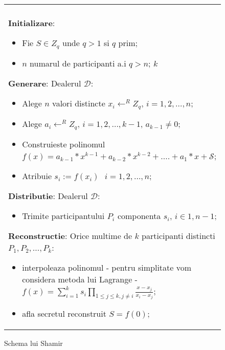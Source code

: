 \documentclass{llncs}
\begin{document}
\begin{figure*}[h!]

\begin{tabular}{|p{\textwidth}|}
\hline

\\
\hspace{.1in}
\textbf{Initializare}: 
	\begin{itemize}
		\item Fie $S \in Z_q$ unde $q > 1 $ si $q$ prim;
		\item $n$ numarul de participanti a.i $q > n$; $k$ 
	\end{itemize}
\medskip

\hspace{.1in}
\textbf{Generare}: Dealerul $\mathcal{D}$:
	\begin{itemize}
		\item Alege $n$ valori distincte $x_i \leftarrow^R Z_q \text{, }i = 1,2,\dots,n$;
		\item Alege $a_{i} \leftarrow^R Z_q \text{, }i = 1,2,\dots,{k - 1}$, $a_{k-1} \neq 0$;
		\item Construieste polinomul $f(x) = a_{k - 1} * x ^ {k-1} + a_{k-2} * x ^ {k - 2} + .... + a_1 * x + \mathcal{S}$;
		\item Atribuie $s_i := f(x_i) \text{ } i = 1,2,\dots,n$;
	\end{itemize}
\medskip

\hspace{.1in}
\textbf{Distributie}: Dealerul $\mathcal{D}$:
	\begin{itemize}
		\item Trimite participantului $P_i$ componenta $s_i$, $i \in {1,n-1}$;
	\end{itemize}

\hspace{.1in}
\textbf{Reconstructie}: Orice multime de $k$ participanti distincti $P_1, P_2, \dots, P_k$:
	\begin{itemize}
		\item interpoleaza polinomul - pentru simplitate vom considera metoda lui Lagrange -
			\hspace{.7in} $f(x)=\sum_{i=1}^{k} {s_i}\prod_{1 \leq j \leq k, j \neq i} \frac{x-x_j}{x_i-x_j}$;
		\item afla secretul reconstruit $S = f(0)$;
	\end{itemize}

\\
\hline
\end{tabular}

\caption{Schema lui Shamir \cite{S:1979}}
\label{fig:shamir_scheme}
\end{figure*}
\end{document}
